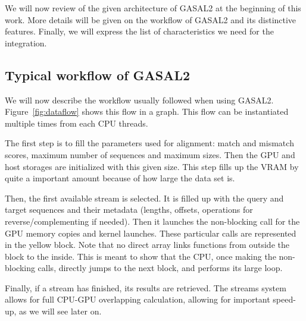 We will now review of the given architecture of GASAL2 at the beginning of this work. More details will be given on the workflow of GASAL2 and its distinctive features. Finally, we will express the list of characteristics we need for the integration.


\subsection{Typical workflow of GASAL2}

We will now describe the workflow usually followed when using GASAL2. Figure~\ref{fig:dataflow} shows this flow in a graph. This flow can be instantiated multiple times from each CPU threads.

The first step is to fill the parameters used for alignment: match and mismatch scores, maximum number of sequences and maximum sizes. Then the GPU and host storages are initialized with this given size. This step fills up the VRAM by quite a important amount because of how large the data set is. 

Then, the first available stream is selected. It is filled up with the query and target sequences and their metadata (lengths, offsets, operations for reverse/complementing if needed). Then it launches the non-blocking call for the GPU memory copies and kernel launches. These particular calls are represented in the yellow block. Note that no direct array links functions from outside the block to the inside. This is meant to show that the CPU, once making the non-blocking calls, directly jumps to the next block, and performs its large loop.

Finally, if a stream has finished, its results are retrieved. The streams system allows for full CPU-GPU overlapping calculation, allowing for important speed-up, as we will see later on.

